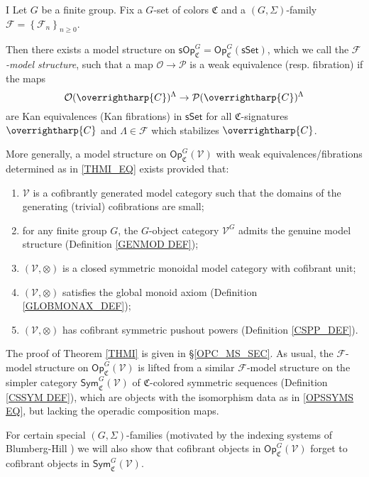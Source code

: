 \documentclass[a4paper,10pt
,draft
]{article}%
\numberwithin{equation}{section}
\numberwithin{figure}{section}
\theoremstyle{definition} %
\newcommand{\set}[1]{\left\{#1\right\}}%
\newcommand{\vect}[1]{\text{\overrightharp{\ensuremath{#1}}}}
\newcommand{\Op}{\mathsf{Op}}%
\newcommand{\F}{\ensuremath{\mathcal F}}
\newcommand{\V}{\ensuremath{\mathcal V}}
\renewcommand{\O}{\ensuremath{\mathcal O}}
\newcommand{\1}{\ensuremath{\mathbbm 1}}%
\begin{document}
\begin{customthm}{I}\label{THMI}
Let $G$ be a finite group. Fix a $G$-set of colors $\mathfrak{C}$
and a $(G,\Sigma)$-family $\F = \set{\F_n}_{n \geq 0}$.

Then there exists a model structure on
$\mathsf{sOp}^G_{\mathfrak{C}} =
\mathsf{Op}^G_{\mathfrak{C}}(\mathsf{sSet})$,
which we call the \emph{$\mathcal{F}$-model structure},
such that a map
$\mathcal{O} \to \mathcal{P}$
is a weak equivalence (resp. fibration) if the maps
\begin{equation}\label{THMI_EQ}
	\O(\vect{C})^{\Lambda} \to \mathcal{P}(\vect{C})^{\Lambda}
\end{equation}
are Kan equivalences (Kan fibrations)
in $\mathsf{sSet}$
for all $\mathfrak{C}$-signatures $\vect{C}$
and $\Lambda \in \F$ which stabilizes $\vect{C}$.

More generally, a model structure on 
$\Op^G_{\mathfrak C}(\V)$
with weak equivalences/fibrations determined as in 
\eqref{THMI_EQ}
exists provided that:
\begin{enumerate}[label = (\roman*)]
	\item $\V$ is a cofibrantly generated model category
	such that the domains of the generating (trivial) cofibrations are small;
	\item for any finite group $G$, the $G$-object category $\V^G$ admits the genuine model structure (Definition \ref{GENMOD DEF});
	\item $(\V, \otimes)$ is a closed symmetric monoidal model category with cofibrant unit;
	\item $(\V, \otimes)$ satisfies the global monoid axiom (Definition \ref{GLOBMONAX_DEF});
	\item $(\V, \otimes)$ has cofibrant symmetric pushout powers (Definition \ref{CSPP_DEF}).
\end{enumerate}
\end{customthm}


The proof of Theorem \ref{THMI} is given in \S \ref{OPC_MS_SEC}.
As usual, the $\F$-model structure on 
$\Op^G_{\mathfrak C}(\V)$ is lifted from 
a similar $\F$-model structure on the simpler category
$\mathsf{Sym}^G_{\mathfrak C}(\V)$
of $\mathfrak{C}$-colored symmetric sequences
(Definition \ref{CSSYM DEF}),
which are objects with the isomorphism data as in 
\eqref{OPSSYMS EQ}, 
but lacking the operadic composition maps.


For certain special $(G,\Sigma)$-families
(motivated by the indexing systems of Blumberg-Hill \cite{BH15})
we will also show that cofibrant objects in 
$\Op^G_{\mathfrak C}(\V)$
forget to cofibrant objects in 
$\mathsf{Sym}^G_{\mathfrak C}(\V)$.
\end{document}
